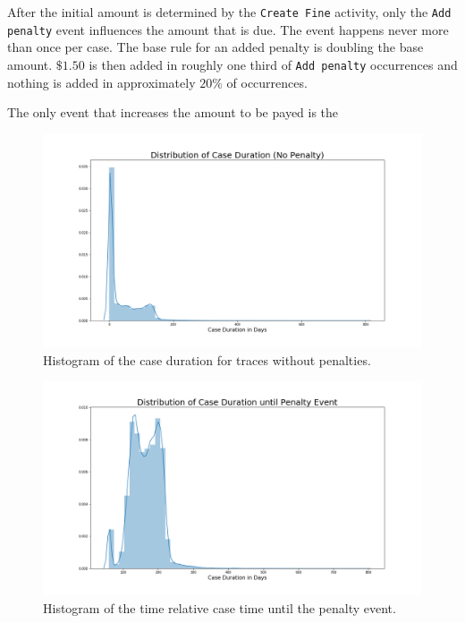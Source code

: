 \documentclass[12pt]{report}
\begin{document}
After the initial amount is determined by the \texttt{Create Fine} activity, only the \texttt{Add penalty} event influences the amount that is due. The event happens never more than once per case. The base rule for an added penalty is doubling the base amount. $\$ 1.50$ is then added in roughly one third of \texttt{Add penalty} occurrences and nothing is added in approximately $20\% $ of occurrences.

The only event that increases the amount to be payed is the 

\begin{figure}[H]
  \centering
  \includegraphics[width=\textwidth]{figures/dlz_no_penalty.png}
  \caption{Histogram of the case duration for traces without penalties.}
  \label{fig:dlz_no_penalty}
\end{figure}

\begin{figure}[H]
  \centering
  \includegraphics[width=\textwidth]{figures/time2penalty.png}
  \caption{Histogram of the time relative case time until the penalty event.}
  \label{fig:time2penalty}
\end{figure}
\end{document}
